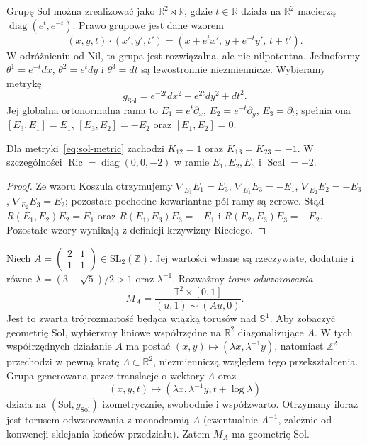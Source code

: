 Grupę Sol można zrealizować jako $\mathbb R^2\rtimes\mathbb R$,
gdzie $t\in\mathbb R$ działa na $\mathbb R^2$ macierzą
$\operatorname{diag}(e^t,e^{-t})$. Prawo grupowe jest dane wzorem
\[
(x,y,t)\cdot(x',y',t')
=(x+e^t x',\,y+e^{-t}y',\,t+t').
\]
W odróżnieniu od Nil, ta grupa jest rozwiązalna, ale nie nilpotentna.
Jednoformy $\theta^1=e^{-t}dx$, $\theta^2=e^t dy$ i
$\theta^3=dt$ są lewostronnie niezmiennicze. Wybieramy metrykę
\begin{equation}\label{eq:sol-metric}
 g_{\mathrm{Sol}}=e^{-2t}dx^2+e^{2t}dy^2+dt^2.
\end{equation}
Jej globalna ortonormalna rama to
$E_1=e^t\partial_x$, $E_2=e^{-t}\partial_y$,
$E_3=\partial_t$; spełnia ona
$[E_3,E_1]=E_1$, $[E_3,E_2]=-E_2$ oraz $[E_1,E_2]=0$.

\begin{twierdzenie}
Dla metryki~\eqref{eq:sol-metric} zachodzi
$K_{12}=1$ oraz $K_{13}=K_{23}=-1$.
W szczególności
$\operatorname{Ric}=\operatorname{diag}(0,0,-2)$
w ramie $E_1,E_2,E_3$ i $\operatorname{Scal}=-2$.
\end{twierdzenie}
\begin{proof}
Ze wzoru Koszula otrzymujemy
$\nabla_{E_1}E_1=E_3$,
$\nabla_{E_1}E_3=-E_1$,
$\nabla_{E_2}E_2=-E_3$,
$\nabla_{E_2}E_3=E_2$;
pozostałe pochodne kowariantne pól ramy są zerowe.
Stąd $R(E_1,E_2)E_2=E_1$ oraz
$R(E_1,E_3)E_3=-E_1$ i $R(E_2,E_3)E_3=-E_2$.
Pozostałe wzory wynikają z definicji krzywizny Ricciego.
\end{proof}

\begin{przyklad}
\label{ex:sol-mapping-torus}
Niech
$A=\left(\begin{smallmatrix}2&1\\1&1\end{smallmatrix}\right)
\in\mathrm{SL}_2(\mathbb Z)$. Jej wartości własne są rzeczywiste,
dodatnie i równe
$\lambda=(3+\sqrt5)/2>1$ oraz $\lambda^{-1}$.
Rozważmy \emph{torus odwzorowania}
\[
M_A=\frac{\mathbb T^2\times[0,1]}
{(u,1)\sim(Au,0)}.
\]
Jest to zwarta trójrozmaitość będąca wiązką torusów nad
$\mathbb S^1$. Aby zobaczyć geometrię Sol, wybierzmy liniowe
współrzędne na $\mathbb R^2$ diagonalizujące $A$.
W tych współrzędnych działanie $A$ ma postać
$(x,y)\mapsto(\lambda x,\lambda^{-1}y)$, natomiast
$\mathbb Z^2$ przechodzi w pewną kratę $\Lambda\subset\mathbb R^2$,
niezmienniczą względem tego przekształcenia.
Grupa generowana przez translacje o wektory $\Lambda$ oraz
\[
 (x,y,t)\longmapsto
 (\lambda x,\lambda^{-1}y,t+\log\lambda)
\]
działa na $(\mathrm{Sol},g_{\mathrm{Sol}})$ izometrycznie,
swobodnie i współzwarto. Otrzymany iloraz jest torusem
odwzorowania z monodromią $A$ (ewentualnie $A^{-1}$,
zależnie od konwencji sklejania końców przedziału).
Zatem $M_A$ ma geometrię Sol.
\end{przyklad}

